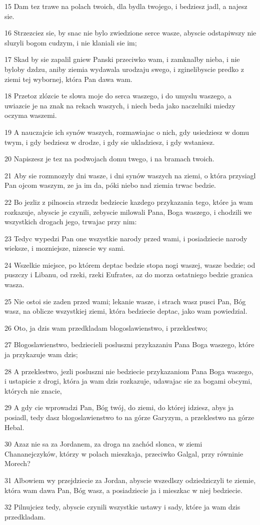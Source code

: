 \par 15 Dam tez trawe na polach twoich, dla bydla twojego, i bedziesz jadl, a najesz sie.
\par 16 Strzezciez sie, by snac nie bylo zwiedzione serce wasze, abyscie odstapiwszy nie sluzyli bogom cudzym, i nie klaniali sie im;
\par 17 Skad by sie zapalil gniew Panski przeciwko wam, i zamknalby nieba, i nie byloby dzdzu, aniby ziemia wydawala urodzaju swego, i zginelibyscie predko z ziemi tej wybornej, która Pan dawa wam.
\par 18 Przetoz zlózcie te slowa moje do serca waszego, i do umyslu waszego, a uwiazcie je na znak na rekach waszych, i niech beda jako naczelniki miedzy oczyma waszemi.
\par 19 A nauczajcie ich synów waszych, rozmawiajac o nich, gdy usiedziesz w domu twym, i gdy bedziesz w drodze, i gdy sie ukladziesz, i gdy wstaniesz.
\par 20 Napiszesz je tez na podwojach domu twego, i na bramach twoich.
\par 21 Aby sie rozmnozyly dni wasze, i dni synów waszych na ziemi, o która przysiagl Pan ojcom waszym, ze ja im da, póki niebo nad ziemia trwac bedzie.
\par 22 Bo jezliz z pilnoscia strzedz bedziecie kazdego przykazania tego, które ja wam rozkazuje, abyscie je czynili, zebyscie milowali Pana, Boga waszego, i chodzili we wszystkich drogach jego, trwajac przy nim:
\par 23 Tedyc wypedzi Pan one wszystkie narody przed wami, i posiadziecie narody wieksze, i mozniejsze, nizescie wy sami.
\par 24 Wszelkie miejsce, po którem deptac bedzie stopa nogi waszej, wasze bedzie; od puszczy i Libanu, od rzeki, rzeki Eufrates, az do morza ostatniego bedzie granica wasza.
\par 25 Nie ostoi sie zaden przed wami; lekanie wasze, i strach wasz pusci Pan, Bóg wasz, na oblicze wszystkiej ziemi, która bedziecie deptac, jako wam powiedzial.
\par 26 Oto, ja dzis wam przedkladam blogoslawienstwo, i przeklestwo;
\par 27 Blogoslawienstwo, bedziecieli posluszni przykazaniu Pana Boga waszego, które ja przykazuje wam dzis;
\par 28 A przeklestwo, jezli posluszni nie bedziecie przykazaniom Pana Boga waszego, i ustapicie z drogi, która ja wam dzis rozkazuje, udawajac sie za bogami obcymi, których nie znacie,
\par 29 A gdy cie wprowadzi Pan, Bóg twój, do ziemi, do której idziesz, abys ja posiadl, tedy dasz blogoslawienstwo to na górze Garyzym, a przeklestwo na górze Hebal.
\par 30 Azaz nie sa za Jordanem, za droga na zachód slonca, w ziemi Chananejczyków, którzy w polach mieszkaja, przeciwko Galgal, przy równinie Morech?
\par 31 Albowiem wy przejdziecie za Jordan, abyscie wszedlszy odziedziczyli te ziemie, która wam dawa Pan, Bóg wasz, a posiadziecie ja i mieszkac w niej bedziecie.
\par 32 Pilnujciez tedy, abyscie czynili wszystkie ustawy i sady, które ja wam dzis przedkladam.


